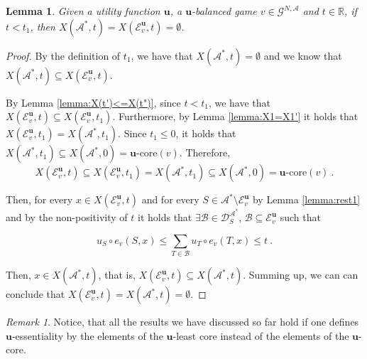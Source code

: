 \documentclass[a4paper,12pt]{article}
\newtheorem{lemma}[theorem]{Lemma}
\theoremstyle{definition}
\theoremstyle{remark}
\newtheorem{remark}[theorem]{Remark}
\begin{document}
\begin{lemma}\label{lemma:t<t_1:X1=X1'}
Given a utility function $\mathbf{u}$, a $\mathbf{u}$-balanced game $v\in \mathcal{G}^{N, \mathcal{A}}$ and $t\in \mathbb{R}$, if $t<t_1$, then $X(\mathcal{A}^\ast, t) = X(\mathcal{E}_v^{\mathbf{u}}, t) = \emptyset$.
\end{lemma}

\begin{proof}
By the definition of $t_1$, we have that $X(\mathcal{A}^\ast, t) = \emptyset$ and we know that $X(\mathcal{A}^\ast, t) \subseteq X(\mathcal{E}_v^{\mathbf{u}}, t)$.

By Lemma \ref{lemma:X(t')<=X(t")}, since $t<t_1$, we have that $X(\mathcal{E}_v^{\mathbf{u}}, t) \subseteq X(\mathcal{E}_v^{\mathbf{u}}, t_1)$. Furthermore, by Lemma \ref{lemma:X1=X1'} it holds that $X(\mathcal{E}_v^{\mathbf{u}}, t_1) = X(\mathcal{A}^\ast, t_1)$. Since $t_1\leq 0$, it holds that $X(\mathcal{A}^\ast, t_1) \subseteq X(\mathcal{A}^\ast, 0) = \mathbf{u}\text{-core}(v)$. Therefore,
\begin{equation*}
X(\mathcal{E}_v^{\mathbf{u}}, t) \subseteq X(\mathcal{E}_v^{\mathbf{u}}, t_1) = X(\mathcal{A}^*, t_1) \subseteq X(\mathcal{A}^*, 0) = \mathbf{u}\text{-core}(v) \ .
\end{equation*}

Then, for every $x\in X(\mathcal{E}_v^{\mathbf{u}}, t)$ and for every $S\in \mathcal{A}^\ast\setminus \mathcal{E}_v^{\mathbf{u}}$ by Lemma \ref{lemma:rest1} and by the non-positivity of $t$ it holds that $\exists \mathcal{B}\in \mathcal{D}_S^{\mathcal{A}^\ast}$, $\mathcal{B} \subseteq \mathcal{E}_v^{\mathbf{u}}$ such that

\begin{equation*}
u_S\circ e_v(S, x) \leq \sum_{T\in \mathcal{B}} u_T \circ e_v(T, x) \leq t \ .
\end{equation*}

Then, $x\in X(\mathcal{A}^\ast, t)$, that is, $X(\mathcal{E}_v^{\mathbf{u}}, t) \subseteq X(\mathcal{A}^\ast, t)$. Summing up, we can can conclude that $X(\mathcal{E}_v^{\mathbf{u}}, t) = X(\mathcal{A}^\ast, t) = \emptyset$.
\end{proof}

\begin{remark}\label{rem:szukmag}
Notice, that all the results we have discussed so far hold if one defines $\mathbf{u}$-essentiality by the elements of the $\mathbf{u}$-least core instead of the elements of the $\mathbf{u}$-core.
\end{remark}
\end{document}
